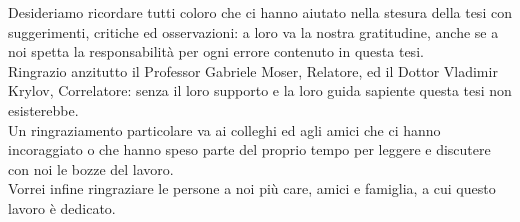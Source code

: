 
\italiano
\ringraziamenti

Desideriamo ricordare tutti coloro che ci hanno aiutato nella stesura della tesi con suggerimenti, critiche ed osservazioni: a loro va la nostra gratitudine, anche se a noi spetta la responsabilità per ogni errore contenuto in questa tesi.\\
Ringrazio anzitutto il Professor Gabriele Moser, Relatore, ed il Dottor Vladimir Krylov, Correlatore: senza il loro supporto e la loro guida sapiente questa tesi non esisterebbe. \\
Un ringraziamento particolare va ai colleghi ed agli amici che ci hanno incoraggiato o che hanno speso parte del proprio tempo per leggere e discutere con noi le bozze del lavoro. \\
Vorrei infine ringraziare le persone a noi più care, amici e famiglia, a cui questo lavoro è dedicato.